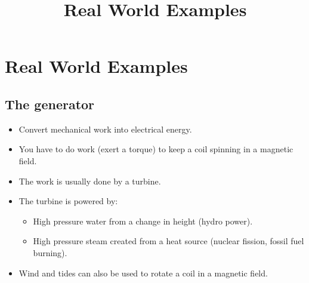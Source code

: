 \documentclass[aspectratio=169,
hyperref={colorlinks,urlcolor=blue}
]{beamer}
\begin{document}








\section{Real World Examples}
\label{sec:realworldsexamples}
\title{Real World Examples}


\begin{frame}
\titlepage
\thispagestyle{empty}
\end{frame}









\subsection{The generator}
\label{subsec:thegenerator}
{
\begin{itemize}
\item Convert mechanical work into electrical energy.
\item You have to do work (exert a torque) to keep a coil spinning in a magnetic field.
\item The work is usually done by a turbine.
\item The turbine is powered by:
\begin{itemize}
\item High pressure water from a change in height (hydro power).
\item High pressure steam created from a heat source (nuclear fission, fossil fuel burning).
\end{itemize}
\item Wind and tides can also be used to rotate a coil in a magnetic field.
\end{itemize}
}
{
\vspace{-1cm}
\vspace{-1cm}
}
\end{document}
